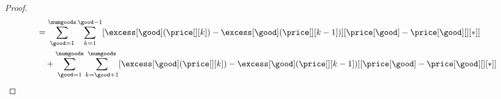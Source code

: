 \begin{proof}
\begin{align*}
        &= \sum_{\good = 1}^\numgoods \sum_{k = 1}^{\good -1 }[\excess[\good](\price[][k]) - \excess[\good](\price[][k - 1])] [\price[\good] - \price[\good][][*]]\\
        & \quad + \sum_{\good = 1}^\numgoods \sum_{k = \good + 1}^{\numgoods} [\excess[\good](\price[][k]) - \excess[\good](\price[][k - 1])] [\price[\good] - \price[\good][][*]]\\

\end{align*}
\end{proof}
